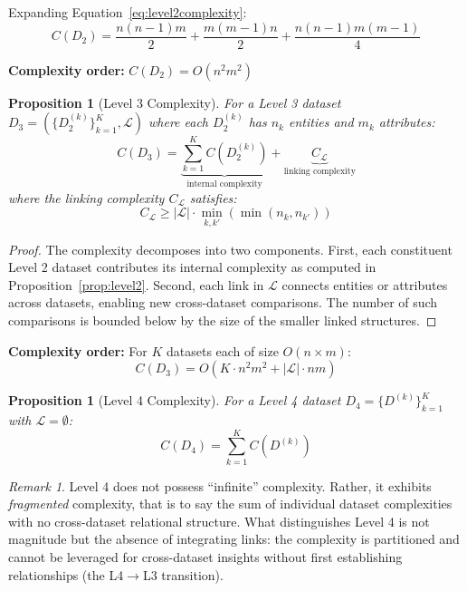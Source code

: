 \documentclass[]{hdsr}
\theoremstyle{plain}      %
\newtheorem{proposition}[theorem]{Proposition}
\theoremstyle{definition} %
\theoremstyle{remark}     %
\newtheorem{remark}[theorem]{Remark}
\begin{document}
\noindent Expanding Equation~\eqref{eq:level2complexity}:
\[
C(D_2) = \frac{n(n-1)m}{2} + \frac{m(m-1)n}{2} + \frac{n(n-1)m(m-1)}{4}
\]

\noindent\textbf{Complexity order:} $C(D_2) = O(n^2 m^2)$

\begin{proposition}[Level 3 Complexity]
\label{prop:level3}
For a Level 3 dataset $D_3 = (\{D_2^{(k)}\}_{k=1}^K, \mathcal{L})$ where each $D_2^{(k)}$ has $n_k$ entities and $m_k$ attributes:
\begin{equation}
C(D_3) = \underbrace{\sum_{k=1}^{K} C(D_2^{(k)})}_{\text{internal complexity}} + \underbrace{C_{\mathcal{L}}}_{\text{linking complexity}}
\label{eq:level3complexity}
\end{equation}
where the linking complexity $C_{\mathcal{L}}$ satisfies:
\[
C_{\mathcal{L}} \geq |\mathcal{L}| \cdot \min_{k,k'} \left( \min(n_k, n_{k'}) \right)
\]
\end{proposition}

\begin{proof}
The complexity decomposes into two components. First, each constituent Level 2 dataset contributes its internal complexity as computed in Proposition~\ref{prop:level2}. Second, each link in $\mathcal{L}$ connects entities or attributes across datasets, enabling new cross-dataset comparisons. The number of such comparisons is bounded below by the size of the smaller linked structures.
\end{proof}

\noindent\textbf{Complexity order:} For $K$ datasets each of size $O(n \times m)$:
\[
C(D_3) = O(K \cdot n^2 m^2 + |\mathcal{L}| \cdot nm)
\]

\begin{proposition}[Level 4 Complexity]
\label{prop:level4}
For a Level 4 dataset $D_4 = \{D^{(k)}\}_{k=1}^K$ with $\mathcal{L} = \emptyset$:
\[
C(D_4) = \sum_{k=1}^{K} C(D^{(k)})
\]
\end{proposition}

\begin{remark}
Level 4 does not possess ``infinite'' complexity. Rather, it exhibits \emph{fragmented} complexity, that is to say the sum of individual dataset complexities with no cross-dataset relational structure. What distinguishes Level 4 is not magnitude but the absence of integrating links: the complexity is partitioned and cannot be leveraged for cross-dataset insights without first establishing relationships (the L4$\to$L3 transition).
\end{remark}
\end{document}
